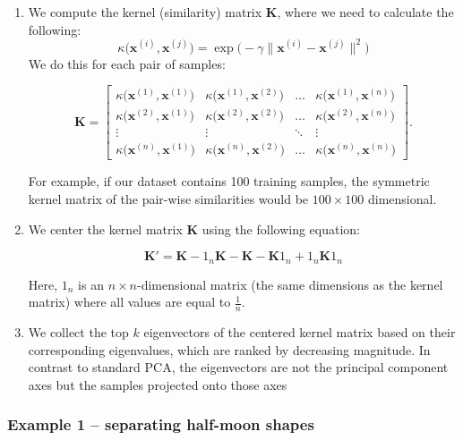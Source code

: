 \documentclass[letterpaper]{report}
\begin{document}
\begin{enumerate}
\item We compute the kernel (similarity) matrix $\mathbf{K}$, where we need to calculate the following:
\[ 
\kappa \big( \mathbf{x}^{(i)}, \mathbf{x}^{(j)}  \big) = \exp \big( -\gamma \lVert \mathbf{x}^{(i)} -  \mathbf{x}^{(j)}  \rVert^2 \big)
\]
We do this for each pair of samples:


\[
\mathbf{K} = \begin{bmatrix}
    \kappa \big(\mathbf{x}^{(1)},\mathbf{x}^{(1)}\big)& \kappa \big(\mathbf{x}^{(1)},\mathbf{x}^{(2)}\big)   & \dots & \kappa \big(\mathbf{x}^{(1)},\mathbf{x}^{(n)}\big) \\
    \kappa \big(\mathbf{x}^{(2)},\mathbf{x}^{(1)}\big) & \kappa \big(\mathbf{x}^{(2)},\mathbf{x}^{(2)}\big) & \dots & \kappa \big(\mathbf{x}^{(2)},\mathbf{x}^{(n)}\big)\\
    \vdots  & \vdots & \ddots & \vdots \\
   \kappa \big(\mathbf{x}^{(n)},\mathbf{x}^{(1)}\big)  & \kappa \big(\mathbf{x}^{(n)},\mathbf{x}^{(2)}\big) & \dots & \kappa \big(\mathbf{x}^{(n)},\mathbf{x}^{(n)}\big)
\end{bmatrix}.
\]

For example, if our dataset contains 100 training samples, the symmetric kernel matrix of the pair-wise similarities would be $100 \times 100$ dimensional.

\item We center the kernel matrix $\mathbf{K}$ using the following equation:

\[
\mathbf{K}' = \mathbf{K} - 1_n \mathbf{K} - \mathbf{K} - \mathbf{K}1_n + 1_n \mathbf{K}1_n
\]

Here, $1_n$ is an $n \times n$-dimensional matrix (the same dimensions as the kernel matrix) where all values are equal to $\frac{1}{n}$.

\item We collect the top $k$ eigenvectors of the centered kernel matrix based on their corresponding eigenvalues, which are ranked by decreasing magnitude. In contrast to standard PCA, the eigenvectors are not the principal component axes but the samples projected onto those axes

\end{enumerate}


\subsubsection{Example 1 -- separating half-moon shapes}
\end{document}
